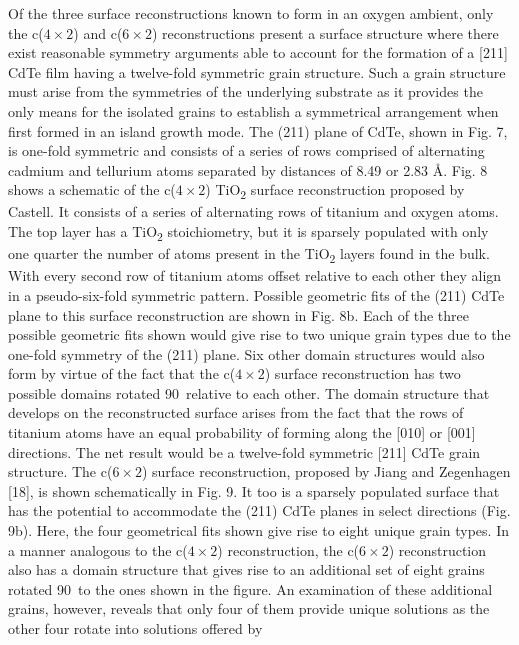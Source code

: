 Of the three surface reconstructions known to form in an
oxygen ambient, only the c($4\times2$) and c($6\times2$) reconstructions
present a surface structure where there exist reasonable symmetry
arguments able to account for the formation of a [211] CdTe film
having a twelve-fold symmetric grain structure. Such a grain
structure must arise from the symmetries of the underlying
substrate as it provides the only means for the isolated grains to
establish a symmetrical arrangement when first formed in an
island growth mode. The (211) plane of CdTe, shown in Fig. 7, is
one-fold symmetric and consists of a series of rows comprised of
alternating cadmium and tellurium atoms separated by distances of 8.49 or 2.83 \AA. Fig. 8 shows a schematic of the c($4\times2$) TiO\textsubscript{2} surface reconstruction proposed by Castell\cite{Castell2002}. It consists of a
series of alternating rows of titanium and oxygen atoms. The top
layer has a TiO\textsubscript{2} stoichiometry, but it is sparsely populated with
only one quarter the number of atoms present in the TiO\textsubscript{2} layers
found in the bulk\cite{Castell2002}. With every second row of titanium atoms
offset relative to each other they align in a pseudo-six-fold
symmetric pattern. Possible geometric fits of the (211) CdTe plane
to this surface reconstruction are shown in Fig. 8b. Each of the three
possible geometric fits shown would give rise to two unique grain
types due to the one-fold symmetry of the (211) plane. Six other
domain structures would also form by virtue of the fact that the
c($4\times2$) surface reconstruction has two possible domains rotated
90\degree~relative to each other\cite{Castell2002}. The domain structure that develops
on the reconstructed surface arises from the fact that the rows of
titanium atoms have an equal probability of forming along the
[010] or [001] directions. The net result would be a twelve-fold
symmetric [211] CdTe grain structure. The c($6\times2$) surface
reconstruction, proposed by Jiang and Zegenhagen [18], is shown
schematically in Fig. 9. It too is a sparsely populated surface that
has the potential to accommodate the (211) CdTe planes in select
directions (Fig. 9b). Here, the four geometrical fits shown give rise
to eight unique grain types. In a manner analogous to the c($4\times2$)
reconstruction, the c($6\times2$) reconstruction also has a domain
structure that gives rise to an additional set of eight grains rotated
90\degree~to the ones shown in the figure. An examination of these
additional grains, however, reveals that only four of them provide
unique solutions as the other four rotate into solutions offered by

